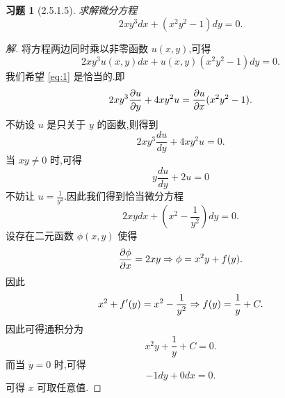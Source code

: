 \documentclass[a4paper, 12pt]{article} %
\newtheorem*{cdtheorem}{习题}
\newenvironment{exercise}
{\bigskip\begin{mdframed}[backgroundcolor=gray!40,rightline=false,leftline=false,topline=false,bottomline=false]\begin{cdtheorem}}
    {\end{cdtheorem}\end{mdframed}\bigskip}
\begin{document}
\begin{exercise}[2.5.1.5]
  求解微分方程
$$
2xy^3dx+(x^2y^2-1)dy=0.
$$
\end{exercise}
\begin{proof}[解]
将方程两边同时乘以非零函数 $u(x,y)$,可得
\begin{equation}
  \label{eq:1}
  2xy^3u(x,y)dx+u(x,y)(x^2y^2-1)dy=0.
\end{equation}
我们希望 \eqref{eq:1} 是恰当的.即
$$
2xy^3\frac{\partial u}{\partial y}+4xy^2u=\frac{\partial u}{\partial x}(x^2y^2-1).
$$
不妨设 $u$ 是只关于 $y$ 的函数,则得到
$$
2xy^3 \frac{du}{dy}+4xy^{2}u=0.
$$
当 $xy\neq 0$ 时,可得
$$
y \frac{du}{dy}+2u=0
$$
不妨让 $u=\frac{1}{y^2}$.因此我们得到恰当微分方程
\begin{equation}
  \label{eq:2}
  2xydx+(x^2-\frac{1}{y^2})dy=0.
\end{equation}
设存在二元函数 $\phi(x,y)$ 使得
$$
\frac{\partial\phi}{\partial x}=2xy\Rightarrow\phi=x^2y+f(y).
$$
因此
$$
x^2+f'(y)=x^2-\frac{1}{y^2}\Rightarrow f(y)=\frac{1}{y}+C.
$$
因此可得通积分为
$$
x^2y+\frac{1}{y}+C=0.
$$
而当 $y=0$ 时,可得 
$$
-1dy+0dx=0.
$$
可得 $x$ 可取任意值.
\begin{comment}
当 $xy\neq 0$ 时,可得
$$
 \frac{du}{dy}=\frac{-2}{y}.
$$
不妨让 $u=-2\ln |y|$.因此我们得到恰当微分方程
\begin{equation}
  \label{eq:2}
  -4xy^3\ln|y|dx-2\ln |y|(x^2y^2-1)dy=0.
\end{equation}
设存在二元函数 $\phi(x,y)$,使得
$$
\frac{\pa \phi}{\pa x}=-4xy^3\ln |y|\ri \phi=-2x^2y^3\ln |y|+f(y).
$$
因此可得
$$
-4x^2y^2\ln |y|-2x^2y^2+f'(y)=2\ln |y|.
$$
\end{comment}
  
\end{proof}





\end{document}
